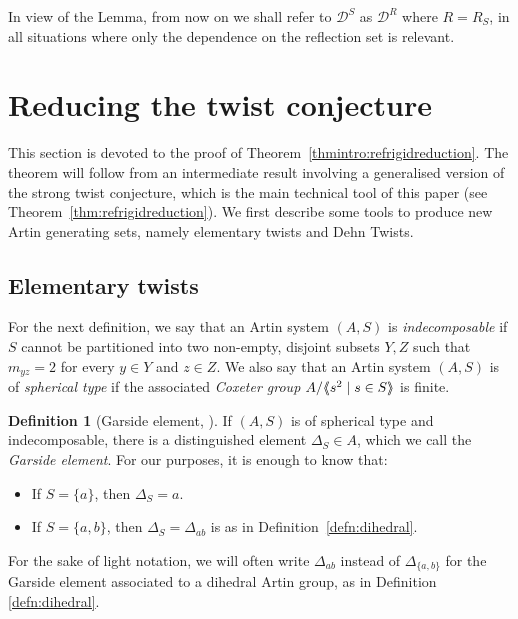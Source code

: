 \documentclass[svgnames]{amsart}
\theoremstyle{plain}
\theoremstyle{definition}
\newtheorem{defn}[thm]{Definition}
\newcommand{\crush}[2]{\mathcal{#1}^{#2}}
\DeclarePairedDelimiter{\nspan}{\langle\mkern-5mu\langle}{\rangle\mkern-5mu\rangle}
\begin{document}
\noindent In view of the Lemma, from now on we shall refer to $\crush{D}{S}$ as $\crush{D}{R}$ where $R=R_S$, in all situations where only the dependence on the reflection set is relevant.



\section{Reducing the twist conjecture}
\label{sec:red twist conj}
This section is devoted to the proof of Theorem~\ref{thmintro:refrigidreduction}. The theorem will follow from an intermediate result involving a generalised version of the strong twist conjecture, which is the main technical tool of this paper (see Theorem~\ref{thm:refrigidreduction}). We first describe some tools to produce new Artin generating sets, namely elementary twists and Dehn Twists.

\subsection{Elementary twists}
For the next definition, we say that an Artin system $(A,S)$ is \emph{indecomposable} if $S$ cannot be partitioned into two non-empty, disjoint subsets $Y,Z$ such that $m_{yz}=2$ for every $y\in Y$ and $z\in Z$. We also say that an Artin system $(A,S)$ is of \emph{spherical type} if the associated \emph{Coxeter group} $A/\nspan{s^2\mid s\in S}$ is finite.
\begin{defn}[{Garside element, \cite{garside}}]
If $(A,S)$ is of spherical type and indecomposable, there is a distinguished element $\Delta_S\in A$, which we call the \emph{Garside element}. For our purposes, it is enough to know that:
\begin{itemize}
\item If $S=\{a\}$, then $\Delta_S=a$.
\item If $S=\{a,b\}$, then $\Delta_S=\Delta_{ab}$ is as in Definition~\ref{defn:dihedral}.
\end{itemize}
\end{defn}
\noindent For the sake of light notation, we will often write $\Delta_{ab}$ instead of $\Delta_{\{a,b\}}$ for the Garside element associated to a dihedral Artin group, as in Definition \ref{defn:dihedral}.
\end{document}

